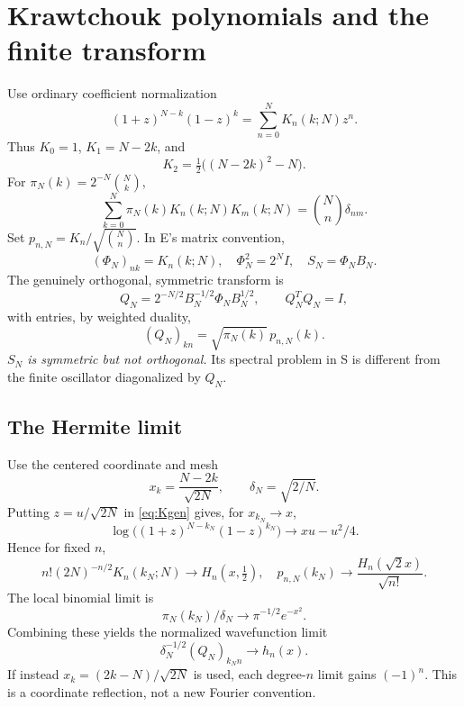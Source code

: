 \documentclass[11pt,reqno]{amsart}
\theoremstyle{remark}\newtheorem{remark}[proposition]{Remark}
\newcommand{\Id}{I}\newcommand{\NN}{\mathcal N}
\begin{document}
\section{Krawtchouk polynomials and the finite transform}\label{sec:K}
Use ordinary coefficient normalization
\begin{equation}\label{eq:Kgen}
 (1+z)^{N-k}(1-z)^k=\sum_{n=0}^N K_n(k;N)z^n.
\end{equation}
Thus $K_0=1$, $K_1=N-2k$, and
\[
 K_2=\tfrac12\big((N-2k)^2-N\big).
\]
For $\pi_N(k)=2^{-N}\binom Nk$,
\begin{equation}\label{eq:Korth}
 \sum_{k=0}^N\pi_N(k)K_n(k;N)K_m(k;N)
 =\binom Nn\delta_{nm}.
\end{equation}
Set $p_{n,N}=K_n/\sqrt{\binom Nn}$. In E's matrix convention,
\[
 (\Phi_N)_{nk}=K_n(k;N),\quad \Phi_N^2=2^N\Id,\quad S_N=\Phi_NB_N.
\]
The genuinely orthogonal, symmetric transform is
\begin{equation}\label{eq:Q}
 Q_N=2^{-N/2}B_N^{-1/2}\Phi_NB_N^{1/2},\qquad Q_N^TQ_N=\Id,
\end{equation}
with entries, by weighted duality,
\[
 (Q_N)_{kn}=\sqrt{\pi_N(k)}\,p_{n,N}(k).
\]
\emph{$S_N$ is symmetric but not orthogonal.} Its spectral problem in S
is different from the finite oscillator diagonalized by $Q_N$.

\subsection{The Hermite limit}
Use the centered coordinate and mesh
\begin{equation}\label{eq:scale}
 x_k=\frac{N-2k}{\sqrt{2N}},\qquad \delta_N=\sqrt{2/N}.
\end{equation}
Putting $z=u/\sqrt{2N}$ in \eqref{eq:Kgen} gives, for $x_{k_N}\to x$,
\[
 \log\big((1+z)^{N-k_N}(1-z)^{k_N}\big)
 \longrightarrow xu-u^2/4.
\]
Hence for fixed $n$,
\begin{equation}\label{eq:KtoH}
 n!(2N)^{-n/2}K_n(k_N;N)\longrightarrow H_n(x,\tfrac12),
 \quad
 p_{n,N}(k_N)\longrightarrow\frac{H_n(\sqrt2x)}{\sqrt{n!}}.
\end{equation}
The local binomial limit is
\[
 \pi_N(k_N)/\delta_N\longrightarrow\pi^{-1/2}e^{-x^2}.
\]
Combining these yields the normalized wavefunction limit
\begin{equation}\label{eq:wave-limit}
 \delta_N^{-1/2}(Q_N)_{k_Nn}\longrightarrow h_n(x).
\end{equation}
If instead $x_k=(2k-N)/\sqrt{2N}$ is used, each degree-$n$ limit gains
$(-1)^n$. This is a coordinate reflection, not a new Fourier convention.
\end{document}
